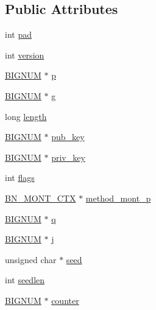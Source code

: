 \subsection*{Public Attributes}
\begin{DoxyCompactItemize}
\item 
int \hyperlink{structdh__st_aae482b7bef6f43b8299ed2bdd1f658c9}{pad}
\item 
int \hyperlink{structdh__st_a661645628bf9785abcb0c7f19946a789}{version}
\item 
\hyperlink{ossl__typ_8h_a6fb19728907ec6515e4bfb716bffa141}{B\+I\+G\+N\+UM} $\ast$ \hyperlink{structdh__st_ad517b332a9e3129370371922b68336b8}{p}
\item 
\hyperlink{ossl__typ_8h_a6fb19728907ec6515e4bfb716bffa141}{B\+I\+G\+N\+UM} $\ast$ \hyperlink{structdh__st_aa4bceea00e97aad49a2fd04b0e552f4f}{g}
\item 
long \hyperlink{structdh__st_ac1a24166e9a30f03bd66fcd8713e560f}{length}
\item 
\hyperlink{ossl__typ_8h_a6fb19728907ec6515e4bfb716bffa141}{B\+I\+G\+N\+UM} $\ast$ \hyperlink{structdh__st_aad2b90e2aa4a6bea39d10a99bcf88324}{pub\+\_\+key}
\item 
\hyperlink{ossl__typ_8h_a6fb19728907ec6515e4bfb716bffa141}{B\+I\+G\+N\+UM} $\ast$ \hyperlink{structdh__st_a3c4e1fb7d7fb23191ec0c4f1229566e2}{priv\+\_\+key}
\item 
int \hyperlink{structdh__st_a6edfd86d7930e5a1c3708f822c9b2680}{flags}
\item 
\hyperlink{ossl__typ_8h_aec902d353e00ced6d3fee6cd033a8bd0}{B\+N\+\_\+\+M\+O\+N\+T\+\_\+\+C\+TX} $\ast$ \hyperlink{structdh__st_a2c49ea291e7d1b359a944e3d807a842f}{method\+\_\+mont\+\_\+p}
\item 
\hyperlink{ossl__typ_8h_a6fb19728907ec6515e4bfb716bffa141}{B\+I\+G\+N\+UM} $\ast$ \hyperlink{structdh__st_a6bbb03a3acdbab173e1b4f74bf53d581}{q}
\item 
\hyperlink{ossl__typ_8h_a6fb19728907ec6515e4bfb716bffa141}{B\+I\+G\+N\+UM} $\ast$ \hyperlink{structdh__st_af6140cb07291cd40b23442d1466ec114}{j}
\item 
unsigned char $\ast$ \hyperlink{structdh__st_ae0d5af379d1113d5d2c402f9d2d85d49}{seed}
\item 
int \hyperlink{structdh__st_a07d3bf5a4dcd263d27d42c92c74d42ef}{seedlen}
\item 
\hyperlink{ossl__typ_8h_a6fb19728907ec6515e4bfb716bffa141}{B\+I\+G\+N\+UM} $\ast$ \hyperlink{structdh__st_a68f2d92b8bc2abd3f0f1d31b061eaf07}{counter}
\item 

\end{DoxyCompactItemize}
